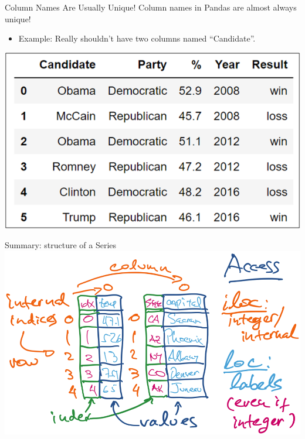 \documentclass[aspectratio=169]{../latex_main/tntbeamer}  %
\begin{document}
	
	
	\begin{frame}{Column Names Are Usually Unique!}
	   Column names in Pandas are almost always unique!
	   \begin{itemize}
	       \item Example: Really shouldn’t have two columns named “Candidate”. 
	   \end{itemize}
	   \centering
	    \includegraphics[scale=.75]{Bild8}
	\end{frame}
	
	
	\begin{frame}{Summary: structure of a Series}
	    \centering
	    \includegraphics[scale=.5]{Bild9}
	\end{frame}
	
\end{document}
